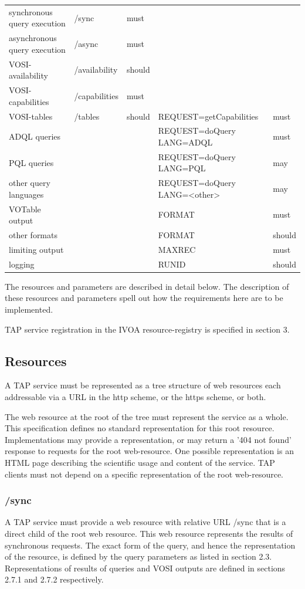 \documentclass[11pt,a4paper]{ivoa}
\begin{document}
\begin{tabular}{l l l l l}
synchronous query execution & /sync & must & & \\
asynchronous query execution & /async & must & & \\
VOSI-availability & /availability & should & & \\
VOSI-capabilities & /capabilities & must & & \\
VOSI-tables & /tables & should & REQUEST=getCapabilities & must \\
ADQL queries & & & REQUEST=doQuery LANG=ADQL & must \\
PQL queries & & & REQUEST=doQuery LANG=PQL & may \\
other query languages & & & REQUEST=doQuery LANG=<other> & may \\
VOTable output & & & FORMAT & must \\
other formats & & & FORMAT & should \\
limiting output & & & MAXREC & must \\
logging & & & RUNID & should \\
\end{tabular}

The resources and parameters are described in detail below. The description of 
these resources and parameters spell out how the requirements here are to be 
implemented.

TAP service registration in the IVOA resource-registry is specified in section 
3.

\subsection{Resources}
A TAP service must be represented as a tree structure of web resources each 
addressable via a URL in the http scheme, or the https scheme, or both.

The web resource at the root of the tree must represent the service as a whole. 
This specification defines no standard representation for this root resource. 
Implementations may provide a representation, or may return a '404 not found' 
response to requests for the root web-resource. One possible representation is 
an HTML page describing the scientific usage and content of the service. TAP 
clients must not depend on a specific representation of the root web-resource.

\subsubsection{/sync}
A TAP service must provide a web resource with relative URL /sync that is a 
direct child of the root web resource. This web resource represents the results 
of synchronous requests. The exact form of the query, and hence the 
representation of the resource, is defined by the  query parameters as listed in 
section 2.3. Representations of results of queries and VOSI outputs are defined 
in sections 2.7.1 and 2.7.2 respectively.
\end{document}
